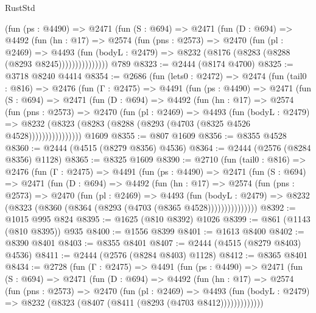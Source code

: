 \begin{lexlean}{RustStd}
\begin{coremodule}
            (fun (ps : @4490) =>
            @2471
              (fun (S : @694) =>
              @2471
                (fun (D : @694) =>
                @4492
                  (fun (hn : @17) =>
                  @2574
                    (fun (pns : @2573) =>
                    @2470
                      (fun (pl : @2469) =>
                      @4493
                        (fun (bodyL : @2479) =>
                        @8232 (@8176 (@8283 (@8288 (@8293 @8245)))))))))))))))
    @789
@8323 := @2444 (@8174 @4700)
@8325 := @3718 @8240 @4414
@8354 := @2686
    (fun (lets0 : @2472) =>
    @2474
      (fun (tail0 : @816) =>
      @2476
        (fun (Γ : @2475) =>
        @4491
          (fun (ps : @4490) =>
          @2471
            (fun (S : @694) =>
            @2471
              (fun (D : @694) =>
              @4492
                (fun (hn : @17) =>
                @2574
                  (fun (pns : @2573) =>
                  @2470
                    (fun (pl : @2469) =>
                    @4493
                      (fun (bodyL : @2479) =>
                      @8232 (@8323 (@8283 (@8288 (@8293 (@4703 (@8325 @4526 @4528))))))))))))))))
    @1609
@8355 := @807 @1609
@8356 := @8355 @4528
@8360 := @2444 (@4515 (@8279 @8356) @4536)
@8364 := @2444 (@2576 (@8284 @8356) @1128)
@8365 := @8325 @1609
@8390 := @2710
    (fun (tail0 : @816) =>
    @2476
      (fun (Γ : @2475) =>
      @4491
        (fun (ps : @4490) =>
        @2471
          (fun (S : @694) =>
          @2471
            (fun (D : @694) =>
            @4492
              (fun (hn : @17) =>
              @2574
                (fun (pns : @2573) =>
                @2470
                  (fun (pl : @2469) =>
                  @4493
                    (fun (bodyL : @2479) =>
                    @8232 (@8323 (@8360 (@8364 (@8293 (@4703 (@8365 @4528)))))))))))))))
@8392 := @1015 @995 @824
@8395 := @1625 (@810 @8392) @1026
@8399 := @861 (@1143 (@810 @8395)) @935
@8400 := @1556 @8399
@8401 := @1613 @8400
@8402 := @8390 @8401
@8403 := @8355 @8401
@8407 := @2444 (@4515 (@8279 @8403) @4536)
@8411 := @2444 (@2576 (@8284 @8403) @1128)
@8412 := @8365 @8401
@8434 := @2728
    (fun (Γ : @2475) =>
    @4491
      (fun (ps : @4490) =>
      @2471
        (fun (S : @694) =>
        @2471
          (fun (D : @694) =>
          @4492
            (fun (hn : @17) =>
            @2574
              (fun (pns : @2573) =>
              @2470
                (fun (pl : @2469) =>
                @4493
                  (fun (bodyL : @2479) =>
                  @8232 (@8323 (@8407 (@8411 (@8293 (@4703 @8412)))))))))))))

\end{coremodule}
\end{lexlean}
